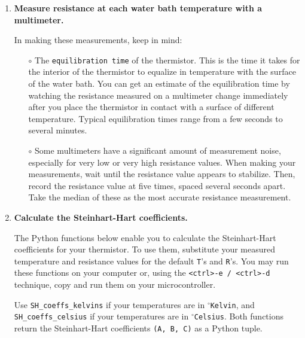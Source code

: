 \begin{enumerate}
\begin{itemize}
	\end{itemize}

	\item \textbf{Measure resistance at each water bath temperature with a multimeter.}

	In making these measurements, keep in mind:
	\begin{itemize}
		\item[$\circ$] The \texttt{equilibration time} of the thermistor.
		This is the time it takes for the interior of the thermistor to equalize in temperature with the surface of the water bath.
		You can get an estimate of the equilibration time by watching the resistance measured on a multimeter change immediately after you place the thermistor in contact with a surface of different temperature.
		Typical equilibration times range from a few seconds to several minutes.
		\item[$\circ$] %
		Some multimeters have a significant amount of measurement noise, especially for very low or very high resistance values.
		When making your measurements, wait until the resistance value appears to stabilize.
		Then, record the resistance value at five times, spaced several seconds apart.
		Take the median of these as the most accurate resistance measurement.
	\end{itemize}

	\item \textbf{Calculate the Steinhart-Hart coefficients.}

	The Python functions below enable you to calculate the Steinhart-Hart coefficients for your thermistor.
	To use them, substitute your measured temperature and resistance values for the default \texttt{T}'s and \texttt{R}'s.
	You may run these functions on your computer or, using the \texttt{<ctrl>-e / <ctrl>-d} technique, copy and run them on your microcontroller.

	\smallskip
	Use \lstinline{SH_coeffs_kelvins} if your temperatures are in $^\circ$\texttt{Kelvin}, and \lstinline{SH_coeffs_celsius} if your temperatures are in $^\circ$\texttt{Celsius}. Both functions return the Steinhart-Hart coefficients \lstinline{(A, B, C)} as a Python tuple.
	



\end{enumerate}
